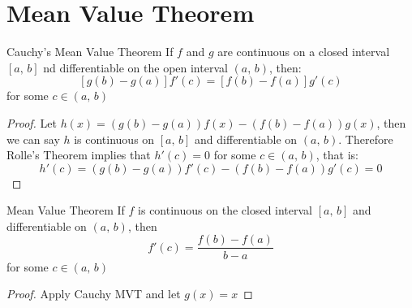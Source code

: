 \documentclass{article}
\begin{document}
\section{Mean Value Theorem}

\noindent\begin{theorem}{Cauchy's Mean Value Theorem}{}
  If $f$ and $g$ are continuous on a closed interval $[a,\, b]$ nd differentiable on the open interval $(a,\, b)$, then:
  $$ [g(b) - g(a)]f'(c) = [f(b) - f(a)]g'(c) $$
  for some $c\in (a,\, b)$
\end{theorem}\vspace{10pt}
\begin{proof}
  Let $h(x) = (g(b) - g(a))f(x)- (f(b) - f(a))g(x)$, then we can say $h$ is continuous on $[a,\, b]$ and differentiable on $(a,\, b)$. Therefore Rolle's Theorem implies that $h'(c) = 0$ for some $c\in (a,\, b)$, that is:
  $$ h'(c) = (g(b) - g(a))f'(c) - (f(b) - f(a))g'(c) = 0 $$
\end{proof}

\noindent\begin{theorem}{Mean Value Theorem}{}
  If $f$ is continuous on the closed interval $[a,\,b]$ and differentiable on $(a,\,b)$, then
  $$ f'(c) = \frac{f(b) - f(a)}{b - a} $$
  for some $c\in (a,\,b)$
\end{theorem}\vspace{10pt}
\begin{figure}[H]
  \centering
\end{figure}
\begin{proof}
  Apply Cauchy MVT and let $g(x) = x$
\end{proof}
\end{document}
